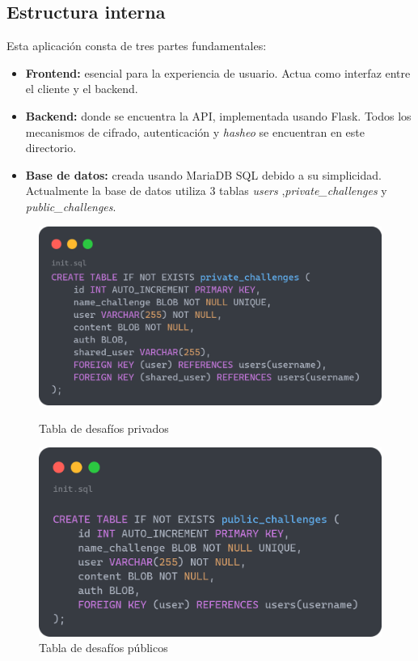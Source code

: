 \documentclass[a4paper,11pt]{article}
\begin{document}
\subsection{Estructura interna}

Esta aplicación consta de tres partes fundamentales:
\begin{itemize}
    \item \textbf{Frontend:} esencial para la experiencia de usuario. Actua como interfaz entre el cliente y el backend.
    \item \textbf{Backend:} donde se encuentra la API, implementada usando
        Flask. Todos los mecanismos de cifrado, autenticación y \textit{hasheo} se encuentran en este directorio.
    \item \textbf{Base de datos:} creada usando MariaDB SQL debido a su
        simplicidad. Actualmente la base de datos utiliza 3 tablas
        \textit{users} ,\textit{private\_challenges} y \textit{public\_challenges}. 
\end{itemize}

\begin{figure}[h]
    \centering
        \begin{minipage}{0.4\textwidth}
        \centering
        \includegraphics[width=\textwidth]{images/privateChallenge.png}
        \caption{Tabla de desafíos privados}
        \label{fig:Tabla de desafios privados}
    \end{minipage}\hfill
    \begin{minipage}{0.4\textwidth}
        \centering
        \includegraphics[width=\textwidth]{images/publicChallenge.png}
        \caption{Tabla de desafíos públicos}
        \label{fig:Tabla de desafíos públicos}
    \end{minipage}
\end{figure}
\end{document}
